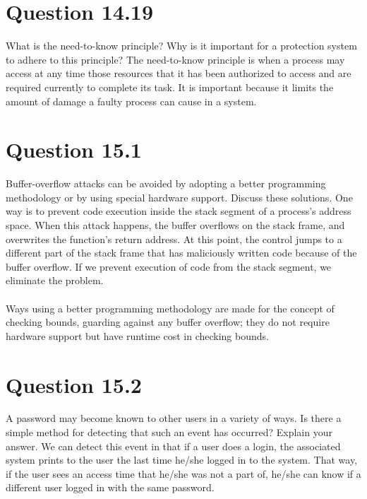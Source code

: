 \documentclass[12pt]{article}
\begin{document}
\section*{Question 14.19} {\color{blue}What is the need-to-know principle? Why is it important for a protection system to adhere to this principle?
} The need-to-know principle is when a process may access at any time those resources that it has been authorized to access and are required currently to complete its task. It is important because it limits the amount of damage a faulty process can cause in a system.

\section*{Question 15.1} {\color{blue}Buffer-overflow attacks can be avoided by adopting a better programming methodology or by using special hardware support. Discuss these solutions.
} One way is to prevent code execution inside the stack segment of a process’s address space. When this attack happens, the buffer overflows on the stack frame, and overwrites the function's return address. At this point, the control jumps to a different part of the stack frame that has maliciously written code because of the buffer overflow. If we prevent execution of code from the stack segment, we eliminate the problem.
\\ \\
Ways using a better programming methodology are made for the concept of checking bounds, guarding against any buffer overflow; they do not require hardware support but have runtime cost in checking bounds.

\section*{Question 15.2} {\color{blue}A password may become known to other users in a variety of ways. Is there a simple method for detecting that such an event has occurred? Explain your answer.} We can detect this event in that if a user does a login, the associated system prints to the user the last time he/she logged in to the system. That way, if the user sees an access time that he/she was not a part of, he/she can know if a different user logged in with the same password.
\end{document}
